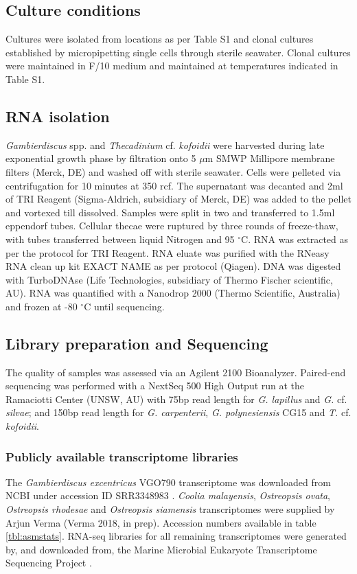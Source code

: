 \documentclass[12pt]{article}
\begin{document}
\subsection{Culture conditions}
\FloatBarrier
Cultures were isolated from locations as per Table S1 and clonal cultures established by micropipetting single cells through sterile seawater. 
Clonal cultures were maintained in F/10 medium and maintained at temperatures indicated in Table S1. 

\subsection{RNA isolation}
\emph{Gambierdiscus} spp. and \emph{Thecadinium} cf. \emph{kofoidii} were harvested during late exponential growth phase by filtration onto 5 $\mu$m SMWP Millipore membrane filters (Merck, DE) and washed off with sterile seawater. 
Cells were pelleted via centrifugation for 10 minutes at 350 rcf. 
The supernatant was decanted and 2ml of TRI Reagent (Sigma-Aldrich, subsidiary of Merck, DE) was added to the pellet and vortexed till dissolved. 
Samples were split in two and transferred to 1.5ml eppendorf tubes. 
Cellular thecae were ruptured by three rounds of freeze-thaw, with tubes transferred between liquid Nitrogen and 95 $^{\circ}$C. 
RNA was extracted as per the protocol for TRI Reagent. 
RNA eluate was purified with the RNeasy RNA clean up kit EXACT NAME as per protocol (Qiagen). 
DNA was digested with TurboDNAse (Life Technologies, subsidiary of Thermo Fischer scientific, AU). 
RNA was quantified with a Nanodrop 2000 (Thermo Scientific, Australia) and frozen at -80 $^{\circ}$C until sequencing.
 
\subsection{Library preparation and Sequencing}
The quality of samples was assessed via an Agilent 2100 Bioanalyzer. 
Paired-end sequencing was performed with a NextSeq 500 High Output run at the Ramaciotti Center (UNSW, AU) with 75bp read length for \emph{G. lapillus} and \emph{G.} cf. \emph{silvae}; and 150bp read length for \emph{G. carpenterii}, \emph{G. polynesiensis} CG15 and \emph{T.} cf. \emph{kofoidii}.

\subsubsection{Publicly available transcriptome libraries}
The \emph{Gambierdiscus excentricus} VGO790 transcriptome was downloaded from NCBI under accession ID SRR3348983 \cite{kohli2017role}. 
\textit{Coolia malayensis}, \textit{Ostreopsis ovata}, \textit{Ostreopsis rhodesae} and \textit{Ostreopsis siamensis} transcriptomes were supplied by Arjun Verma (Verma 2018, in prep). 
Accession numbers available in table \ref{tbl:asmstats}. 
RNA-seq libraries for all remaining transcriptomes were generated by, and downloaded from, the Marine Microbial Eukaryote Transcriptome Sequencing Project \citep{keeling2014marine}.
\end{document}
